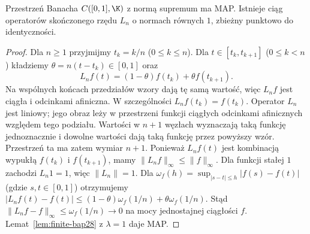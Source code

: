 \begin{twierdzenie}
\label{thm:c01-map28}
Przestrzeń Banacha $C([0,1],\K)$ z normą supremum
ma MAP. Istnieje ciąg operatorów skończonego rzędu
$L_n$ o normach równych $1$, zbieżny punktowo do
identyczności.
\end{twierdzenie}
\begin{proof}
Dla $n\ge1$ przyjmijmy $t_k=k/n$ ($0\le k\le n$).
Dla $t\in[t_k,t_{k+1}]$ ($0\le k<n$) kładziemy
$\theta=n(t-t_k)\in[0,1]$ oraz
\[
L_nf(t)=(1-\theta)f(t_k)+\theta f(t_{k+1}).
\]
Na wspólnych końcach przedziałów wzory dają tę samą wartość,
więc $L_nf$ jest ciągła i odcinkami afiniczna.
W szczególności $L_nf(t_k)=f(t_k)$.
Operator $L_n$ jest liniowy; jego obraz leży w przestrzeni
funkcji ciągłych odcinkami afinicznych względem tego podziału.
Wartości w $n+1$ węzłach wyznaczają taką funkcję jednoznacznie
i dowolne wartości dają taką funkcję przez powyższy wzór.
Przestrzeń ta ma zatem wymiar $n+1$.
Ponieważ $L_nf(t)$ jest kombinacją wypukłą
$f(t_k)$ i $f(t_{k+1})$, mamy
$\|L_nf\|_\infty\le\|f\|_\infty$. Dla funkcji stałej
$1$ zachodzi $L_n1=1$, więc $\|L_n\|=1$.
Dla $\omega_f(h)=\sup_{|s-t|\le h}|f(s)-f(t)|$
(gdzie $s,t\in[0,1]$) otrzymujemy
$|L_nf(t)-f(t)|\le(1-\theta)\omega_f(1/n)+\theta\omega_f(1/n)$.
Stąd $\|L_nf-f\|_\infty\le\omega_f(1/n)\to0$
na mocy jednostajnej ciągłości $f$. Lemat~\ref{lem:finite-bap28}
z $\lambda=1$ daje MAP.
\end{proof}

